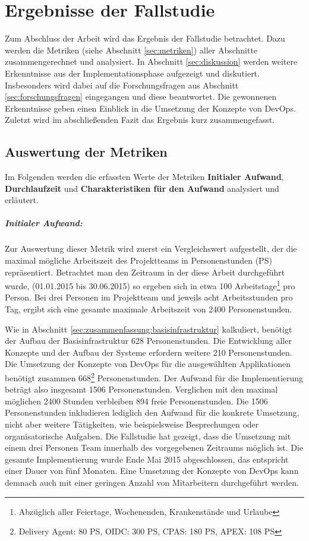 \chapter{Ergebnisse der Fallstudie}
Zum Abschluss der Arbeit wird das Ergebnis der Fallstudie betrachtet. Dazu werden die Metriken (siehe Abschnitt \ref{sec:metriken}) aller Abschnitte zusammengerechnet und analysiert. In Abschnitt \ref{sec:diskussion} werden weitere Erkenntnisse aus der Implementationsphase aufgezeigt und diskutiert. Insbesonders wird dabei auf die Forschungsfragen aus Abschnitt \ref{sec:forschungsfragen} eingegangen und diese beantwortet. Die gewonnenen Erkenntnisse geben einen Einblick in die Umsetzung der Konzepte von DevOps. Zuletzt wird im abschließenden Fazit das Ergebnis kurz zusammengefasst.

\section{Auswertung der Metriken}
\label{sec:auswertungmetriken}
Im Folgenden werden die erfassten Werte der Metriken \textbf{Initialer Aufwand}, \textbf{Durchlaufzeit} und \textbf{Charakteristiken für den Aufwand} analysiert und erläutert.

\paragraph{Initialer Aufwand:}
Zur Auswertung dieser Metrik wird zuerst ein Vergleichswert aufgestellt, der die maximal mögliche Arbeitszeit des Projektteams in Personenstunden (PS) repräsentiert. Betrachtet man den Zeitraum in der diese Arbeit durchgeführt wurde, (01.01.2015 bis 30.06.2015) so ergeben sich in etwa 100 Arbeitstage\footnote{Abzüglich aller Feiertage, Wochenenden, Krankenstände und Urlaube} pro Person. Bei drei Personen im Projektteam und jeweils acht Arbeitsstunden pro Tag, ergibt sich eine gesamte maximale Arbeitszeit von 2400 Personenstunden.

Wie in Abschnitt \ref{sec:zusammenfassung:basisinfrastruktur} kalkuliert, benötigt der Aufbau der Basisinfrastruktur 628 Personenstunden. Die Entwicklung aller Konzepte und der Aufbau der Systeme erfordern weitere 210 Personenstunden. Die Umsetzung der Konzepte von DevOps für die ausgewählten Applikationen benötigt zusammen 668\footnote{Delivery Agent: 80 PS, OIDC: 300 PS, CPAS: 180 PS, APEX: 108 PS} Personenstunden. Der Aufwand für die Implementierung beträgt also insgesamt 1506 Personenstunden. Verglichen mit den maximal möglichen 2400 Stunden verbleiben 894 freie Personenstunden. Die 1506 Personenstunden inkludieren lediglich den Aufwand für die konkrete Umsetzung, nicht aber weitere Tätigkeiten, wie beispielsweise Besprechungen oder organisatorische Aufgaben. Die Fallstudie hat gezeigt, dass die Umsetzung mit einem drei Personen Team innerhalb des vorgegebenen Zeitraums möglich ist. Die gesamte Implementierung wurde Ende Mai 2015 abgeschlossen, das entspricht einer Dauer von fünf Monaten. Eine Umsetzung der Konzepte von DevOps kann demnach auch mit einer geringen Anzahl von Mitarbeitern durchgeführt werden.

